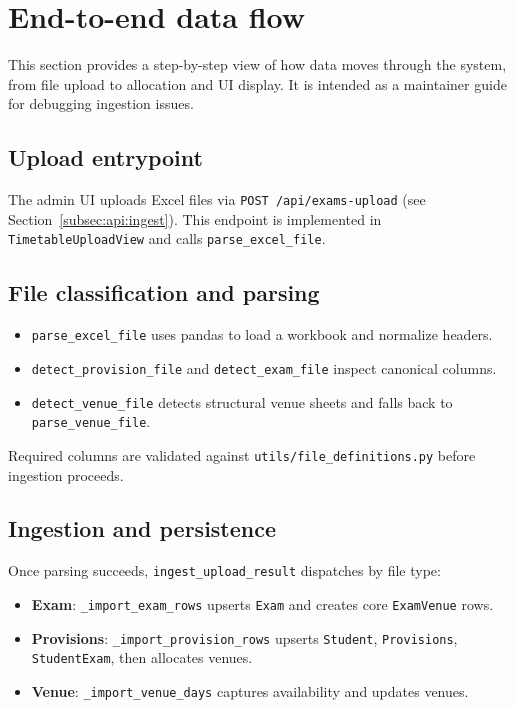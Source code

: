 \section{End-to-end data flow}
\label{sec:dataflow}

This section provides a step-by-step view of how data moves through the system, from file upload to allocation and UI display. It is intended as a maintainer guide for debugging ingestion issues.

\subsection{Upload entrypoint}
\label{subsec:dataflow:entry}

The admin UI uploads Excel files via \texttt{POST /api/exams-upload} (see Section~\ref{subsec:api:ingest}). This endpoint is implemented in \texttt{TimetableUploadView} and calls \texttt{parse\_excel\_file}.

\subsection{File classification and parsing}
\label{subsec:dataflow:parse}

\begin{itemize}
  \item \texttt{parse\_excel\_file} uses pandas to load a workbook and normalize headers.
  \item \texttt{detect\_provision\_file} and \texttt{detect\_exam\_file} inspect canonical columns.
  \item \texttt{detect\_venue\_file} detects structural venue sheets and falls back to \texttt{parse\_venue\_file}.
\end{itemize}

Required columns are validated against \texttt{utils/file\_definitions.py} before ingestion proceeds.

\subsection{Ingestion and persistence}
\label{subsec:dataflow:ingest}

Once parsing succeeds, \texttt{ingest\_upload\_result} dispatches by file type:

\begin{itemize}
  \item \textbf{Exam}: \texttt{\_import\_exam\_rows} upserts \texttt{Exam} and creates core \texttt{ExamVenue} rows.
  \item \textbf{Provisions}: \texttt{\_import\_provision\_rows} upserts \texttt{Student}, \texttt{Provisions}, \texttt{StudentExam}, then allocates venues.
  \item \textbf{Venue}: \texttt{\_import\_venue\_days} captures availability and updates venues.
\end{itemize}

